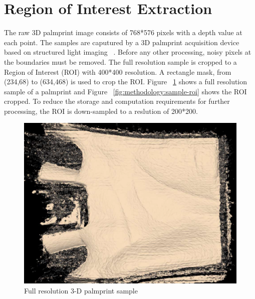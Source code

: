 \section{Region of Interest Extraction}
\label{sec:methodology:roiextraction}

The raw 3D palmprint image consists of 768*576 pixels with a depth value at each point. The samples are caputured by a 3D palmprint acquisition device based on structured light imaging ~\cite{Zhang:2009dp}. Before any other processing, noisy pixels at the boundaries must be removed. The full resolution sample is cropped to a Region of Interest (ROI) with 400*400 resolution. A rectangle mask, from (234,68) to (634,468) is used to crop the ROI. Figure ~\ref{fig:methodology:sample-fullres} shows a full resolution sample of a palmprint and Figure ~\ref{fig:methodology:sample-roi} shows the ROI cropped. To reduce the storage and computation requirements for further processing, the ROI is down-sampled to a reslution of 200*200.

\begin{figure}[htb]
  \begin{center}
    \includegraphics[width=0.9\linewidth]{ch-methodology/figures/sample-fullres}
    \caption[Full resolution 3-D palmprint sample]{Full resolution 3-D palmprint sample}    \label{fig:methodology:sample-fullres}
  \end{center}
\end{figure}

